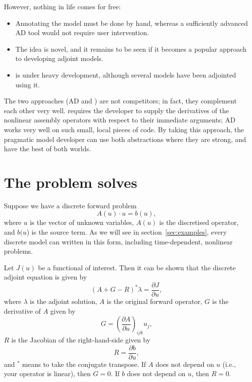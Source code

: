 However, nothing in life comes for free:
\begin{itemize}
\item Annotating the model must be done by hand, whereas a sufficiently advanced
AD tool would not require user intervention.
\item The idea is novel, and it remains to be seen if it becomes a popular approach
to developing adjoint models.
\item \libadjoint is under heavy development, although several models have been adjointed
using it.
\end{itemize}

The two approaches (AD and \libadjoint) are not competitors; in fact, they complement each
other very well. \libadjoint requires
the developer to supply the derivatives of the nonlinear assembly operators with respect to
their immediate arguments; AD works very well on such small, local pieces of code. By taking
this approach, the pragmatic model developer can use both abstractions where they are strong,
and have the best of both worlds.

\section{The problem \libadjoint solves}
Suppose we have a discrete forward problem
\begin{equation*}
A(u)\cdot u = b(u),
\end{equation*}
where $u$ is the vector of unknown variables, $A(u)$ is the discretised operator,
and $b(u$) is the source term. As we will see in section~\ref{sec:examples}, every discrete model
can written in this form, including time-dependent, nonlinear problems.

Let $J(u)$ be a functional of interest. Then it can be shown \citep{gunzburger2003} that
the discrete adjoint equation is given by
\begin{equation*}
(A + G - R)^* \lambda = \frac{\partial J}{\partial u},
\end{equation*}
where $\lambda$ is the adjoint solution, $A$ is the original forward operator, $G$ is the derivative of $A$ given by
\begin{equation*}
G = \left({\frac{\partial A}{\partial u}}\right)_{ijk} u_j,
\end{equation*}
$R$ is the Jacobian of the right-hand-side given by
\begin{equation*}
R = \frac{\partial b}{\partial u},
\end{equation*}
and $^*$ means to take the conjugate transpose. If $A$ does not depend on
$u$ (i.e., your operator is linear), then $G=0$. If $b$ does not depend on
$u$, then $R=0$.


